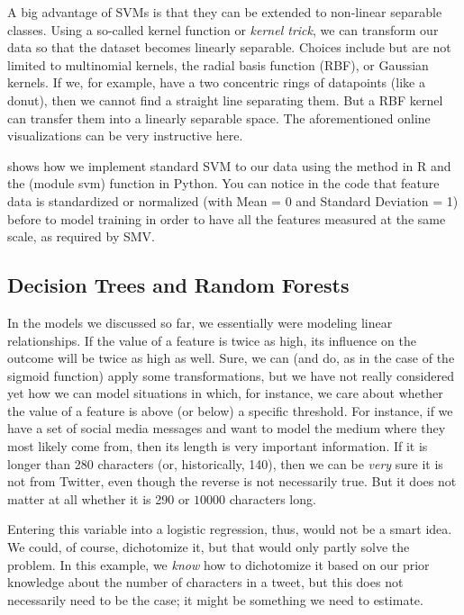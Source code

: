 A big advantage of SVMs is that they can be extended to non-linear
separable classes. Using a so-called kernel function or \emph{kernel trick}, we can transform
our data so that the dataset becomes linearly separable. Choices
include but are not limited to multinomial kernels, the radial basis
function (RBF), or Gaussian kernels. If we, for example, have a two
concentric rings of datapoints (like a donut), then we cannot find a
straight line separating them. But a RBF kernel can transfer them into
a linearly separable space. The aforementioned online visualizations
can be very instructive here.

 shows how we implement standard SVM to our data using the  method  in R and the  (module svm) function  in Python. You can notice in the code that feature data is standardized or normalized (with Mean = 0 and Standard Deviation = 1) before to model training in order to have all the features measured at the same scale, as required by SMV.




\subsection{Decision Trees and Random Forests}
\label{subsec:randomforest}
In the models we discussed so far, we essentially were modeling linear
relationships. If the value of a feature is twice as high, its
influence on the outcome will be twice as high as well.  Sure, we can
(and do, as in the case of the sigmoid function) apply some
transformations, but we have not really considered yet how we can
model situations in which, for instance, we care about whether the
value of a feature is above (or below) a specific threshold.  For
instance, if we have a set of social media messages and want to model
the medium where they most likely come from, then its length is very
important information. If it is longer than 280 characters (or,
historically, 140), then we can be \emph{very} sure it is not from
Twitter, even though the reverse is not necessarily true. But it does
not matter at all whether it is 290 or $10000$ characters long.

Entering this variable into a logistic regression, thus, would not be
a smart idea.  We could, of course, dichotomize it, but that would
only partly solve the problem.  In this example, we \emph{know} how to
dichotomize it based on our prior knowledge about the number of
characters in a tweet, but this does not necessarily need to be the
case; it might be something we need to estimate.

